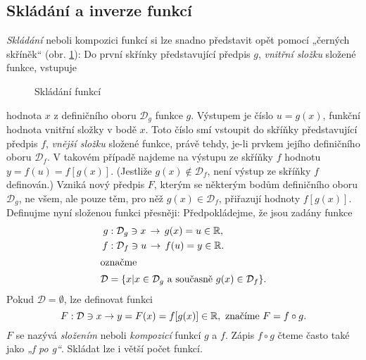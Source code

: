 {    \subsection{Skládání a inverze funkcí}
      \emph{Skládání} neboli kompozici funkcí si lze snadno představit opět pomocí „černých 
      skříněk“ (obr. \ref{mai_fig012}): Do první skřínky představující předpis \(g\), \emph{vnitřní 
      složku} složené funkce, vstupuje
      \begin{figure}[ht!] %
        \centering
        
        \caption{Skládání funkcí \cite[s.~59]{Musilova2009MA1}}
        \label{mai_fig012}
      \end{figure}
      hodnota \(x\) z definičního oboru \(\mathcal{D}_g\) funkce \(g\). Výstupem je číslo \(u = 
      g(x)\), funkční hodnota vnitřní složky v bodě \(x\). Toto číslo smí vstoupit do skříňky 
      představující předpis \(f\), \emph{vnější složku} složené funkce, právě tehdy, je-li prvkem 
      jejího definičního oboru \(\mathcal{D}_f\). V takovém případě najdeme na výstupu ze skříňky 
      \(f\) hodnotu \(y = f(u) = f[g(x)]\). (Jestliže \(g(x)\notin\mathcal{D}_f\), není výstup ze 
      skříňky \(f\) definován.) Vzniká nový předpis \(F\), kterým se některým bodům definičního 
      oboru \(\mathcal{D}_g\), ne všem, ale pouze těm, pro něž \(g(x)\in\mathcal{D}_f\), 
      přiřazují hodnoty \(f[g(x)]\). Definujme nyní složenou funkci přesněji: Předpokládejme, že 
      jsou zadány funkce
      \begin{align*}
        g  &: \mathcal{D}_g\ni x\,\rightarrow\, g(x) = u\in\mathbb{R}, \\
        f  &: \mathcal{D}_f\ni u\,\rightarrow\, f(u) = y\in\mathbb{R}. \\
        \shortintertext{označme}
        \mathcal{D} &= \{x|x\in\mathcal{D}_g \text{ a současně } g(x)\in\mathcal{D}_f\}.
      \end{align*}
      Pokud \(\mathcal{D} = \emptyset\), lze definovat funkci
      \begin{equation*}
        F: \mathcal{D}\ni x\rightarrow y = F(x) = f[g(x)]\in\mathbb{R}, 
           \text{ značíme } F = f \circ g.
      \end{equation*}
      \(F\) se nazývá \emph{složením} neboli \emph{kompozicí} funkcí \(g\) a \(f\). Zápis \(f\circ 
      g\) čteme často také jako \emph{„f po g“}. Skládat lze i větší počet funkcí.

         
      
}
